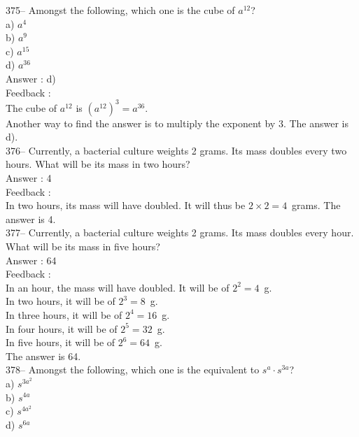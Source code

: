 ﻿\documentclass[letterpaper, 12pt]{article}
\begin{document}
375-- Amongst the following, which one is the cube of $a^{12}$?\\
a) $a^{4}$\\
b) $a^{9}$\\
c) $a^{15}$\\
d) $a^{36}$\\

Answer : d) \\

Feedback : \\
The cube of $a^{12}$ is $\left( a^{12}\right)^{3}=a^{36}$.  \\
Another way to find the answer is to multiply the exponent by 3.
The answer is d).\\

376-- Currently, a bacterial culture weights 2 grams.
Its mass doubles every two hours. What will be its mass in two hours?\\

Answer : 4\\

Feedback : \\
In two hours, its mass will have doubled. It will thus be $2\times
2=4$~grams.  The answer is 4.\\

377-- Currently, a bacterial culture weights 2 grams.
Its mass doubles every hour. What will be its mass in five hours?\\

Answer : 64\\

Feedback : \\
In an hour, the mass will have doubled. It will be of $2^{2}=4$~g.\\
In two hours, it will be of $2^{3}=8$~g.\\
In three hours, it will be of $2^{4}=16$~g.\\
In four hours, it will be of $2^{5}=32$~g.\\
In five hours, it will be of $2^{6}=64$~g.\\
The answer is 64.\\

378-- Amongst the following, which one is the equivalent to
$s^{a}\cdot s^{3a}$?\\
a) $s^{3a^{2}}$\\
b) $s^{4a}$\\
c) $s^{4a^{2}}$\\
d) $s^{6a}$\\
\end{document}

